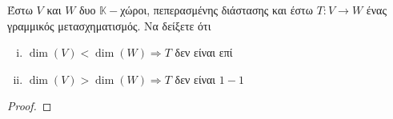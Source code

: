 \begin{prop}
  Έστω $V$ και $W$ δυο $ \mathbb{K}- $χώροι, πεπερασμένης διάστασης και έστω 
  $ T \colon V \to W $ ένας γραμμικός μετασχηματισμός. Να δείξετε ότι 
  \begin{enumerate}[i)]
    \item $ \dim(V) < \dim(W) \Rightarrow T $ δεν είναι επί
    \item $ \dim(V) > \dim(W) \Rightarrow T $ δεν είναι $ 1-1 $ 
  \end{enumerate}
\end{prop}

\begin{proof}
\end{proof}


 
